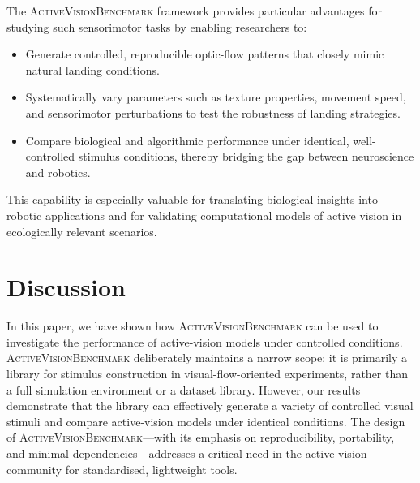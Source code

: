 \documentclass[12pt,a4paper]{article}
\newcommand{\avb}{\textsc{ActiveVisionBenchmark}}  %
\begin{document}
The \avb{} framework provides particular advantages for studying such sensorimotor tasks by enabling researchers to:
\begin{itemize}
    \item Generate controlled, reproducible optic-flow patterns that closely mimic natural landing conditions.
    \item Systematically vary parameters such as texture properties, movement speed, and sensorimotor perturbations to test the robustness of landing strategies.
    \item Compare biological and algorithmic performance under identical, well-controlled stimulus conditions, thereby bridging the gap between neuroscience and robotics.
\end{itemize}
This capability is especially valuable for translating biological insights into robotic applications and for validating computational models of active vision in ecologically relevant scenarios.

\section{Discussion}
\label{sec:discussion}

In this paper, we have shown how \avb{} can be used to investigate the performance of active-vision models under controlled conditions. \avb{} deliberately maintains a narrow scope: it is primarily a library for stimulus construction in visual-flow-oriented experiments, rather than a full simulation environment or a dataset library. However, our results demonstrate that the library can effectively generate a variety of controlled visual stimuli and compare active-vision models under identical conditions. The design of \avb{}---with its emphasis on reproducibility, portability, and minimal dependencies---addresses a critical need in the active-vision community for standardised, lightweight tools.
\end{document}
